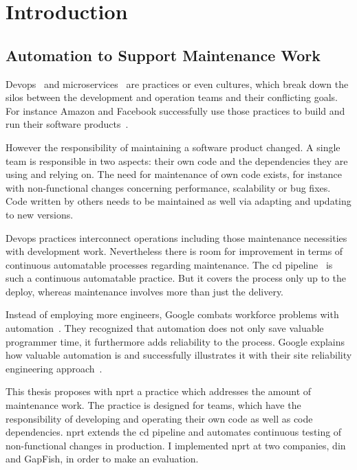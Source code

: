 \chapter{Introduction}
\label{chap:intro}
\section{Automation to Support Maintenance Work}

Devops~\cite{devops_definition} and microservices~\cite{microservices_fowler} are
practices or even cultures, which break down the silos between the development and
operation teams and their conflicting goals. For instance Amazon and Facebook successfully
use those practices to build and run their software products~\cite{build_run,dev_at_fb}.

However the responsibility of maintaining a software product changed. A single team is
responsible in two aspects: their own code and the dependencies they are using and relying
on. The need for maintenance of own code exists, for instance with non-functional changes
concerning performance, scalability or bug fixes. Code written by others needs to be
maintained as well via adapting and updating to new versions.

Devops practices interconnect operations including those maintenance necessities with
development work. Nevertheless there is room for improvement in terms of continuous
automatable processes regarding maintenance. The \gls{cd}
pipeline~\cite{cd_humble_pipeline} is such a continuous automatable practice. But it
covers the process only up to the deploy, whereas maintenance involves more than just the
delivery.

Instead of employing more engineers, Google combats workforce problems with
automation~\cite{sre_automation}. They recognized that automation does not only save
valuable programmer time, it furthermore adds reliability to the process. Google explains
how valuable automation is and successfully illustrates it with their site reliability
engineering approach~\cite{sre_intro}.

This thesis proposes with \gls{nprt} a practice which addresses the amount of maintenance
work. The practice is designed for teams, which have the responsibility of developing and
operating their own code as well as code dependencies. \gls{nprt} extends the \gls{cd}
pipeline and automates continuous testing of non-functional changes in production. I
implemented \gls{nprt} at two companies, \gls{din} and GapFish, in order to make an
evaluation.

